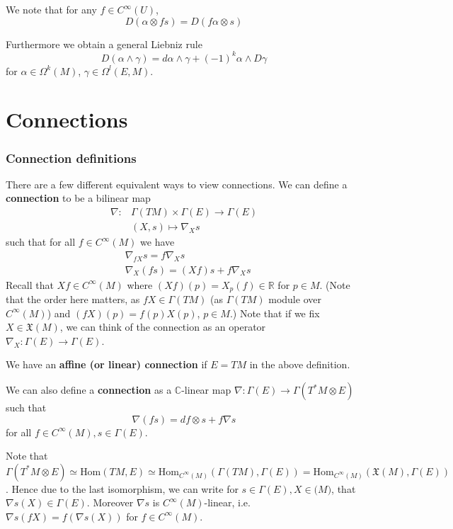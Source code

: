 \documentclass[a4paper]{article}
\theoremstyle{definition} \newtheorem*{definition}{Definition}
\theoremstyle{definition} \newtheorem*{definitions}{Definitions}
\theoremstyle{plain} \newtheorem{theorem}{Theorem}[section]
\theoremstyle{plain} \newtheorem{proposition}[theorem]{Proposition}
\theoremstyle{plain} \newtheorem{corollary}[theorem]{Corollary}
\theoremstyle{plain} \newtheorem{lemma}[theorem]{Lemma}
\theoremstyle{plain} \newtheorem{example}[theorem]{Example}
\newcommand{\defn}[1]{\textbf{#1}}
\newcommand{\realnos}{\mathbb{R}}
\newcommand{\complexnos}{\mathbb{C}}
\newcommand{\Hom}{\text{Hom}}
\newcommand{\smooth}{C^\infty}
\begin{document}
We note that for any $f\in \smooth(U)$,
$$D(\alpha \otimes fs) = D (f\alpha \otimes s)$$

Furthermore we obtain a general Liebniz rule
$$D(\alpha \wedge \gamma)=d\alpha \wedge \gamma + (-1)^k \alpha \wedge D\gamma$$
for $\alpha \in \Omega^k(M)$, $\gamma\in \Omega^l(E, M)$. 

\section{Connections}

\subsubsection{Connection definitions}

There are a few different equivalent ways to view connections.
We can define a \defn{connection} to be a bilinear map 
\begin{align*}
\nabla: & \Gamma(TM)\times \Gamma(E)\to \Gamma(E) \\
& (X, s)\mapsto \nabla_X s
\end{align*}
such that for all $f\in \smooth (M)$ we have
\begin{align*}
& \nabla_{fX}s=f\nabla_X s \\
& \nabla_X(fs)=(Xf)s + f\nabla_X s 
\end{align*}
Recall that $Xf\in \smooth(M)$ where $(Xf)(p)=X_p(f)\in \realnos$ for $p\in M$. (Note that the order here matters, as $fX\in \Gamma(TM)$ (as $\Gamma(TM)$ module over $\smooth(M)$) and $(fX)(p) = f(p)X(p)$, $p\in M$.) Note that if we fix 
$X\in \mathfrak{X}(M)$, we can think of the connection as an operator $\nabla_X:\Gamma(E)\to \Gamma(E)$.

We have an \defn{affine (or linear) connection} if $E=TM$ in the above definition.

We can also define a \defn{connection} as a $\complexnos$-linear map $\nabla : \Gamma(E)\to \Gamma(T^\ast M\otimes E)$ such that 
$$\nabla(fs)=df \otimes s + f\nabla s$$ 
for all $f\in C^\infty(M), s\in \Gamma(E)$.   

Note that $\Gamma(T^*M\otimes E)\simeq \Hom(TM, E)\simeq \Hom_{\smooth(M)}(\Gamma(TM), \Gamma(E)) = \Hom_{\smooth(M)}(\mathfrak{X}(M), \Gamma(E))$. Hence due to the last isomorphism, we can write for $s\in \Gamma(E), X\in \mathfrak(M)$, that $\nabla s(X)\in \Gamma(E)$. Moreover $\nabla s$ is $\smooth(M)$-linear, i.e. $\nabla s(fX)=f(\nabla s (X))$ for $f\in \smooth (M)$.
\end{document}
